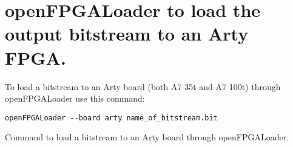 \section{openFPGALoader to load the output bitstream to an Arty FPGA.}

\label{ofl}

To load a bitstream to an Arty board (both A7 35t and A7 100t) through openFPGALoader use this command: 

\begin{code}
\begin{verbatim}
openFPGALoader --board arty name_of_bitstream.bit
\end{verbatim}
\caption{Command to load a bitstream to an Arty board through openFPGALoader.}
\label{cod:8}
\end{code}


